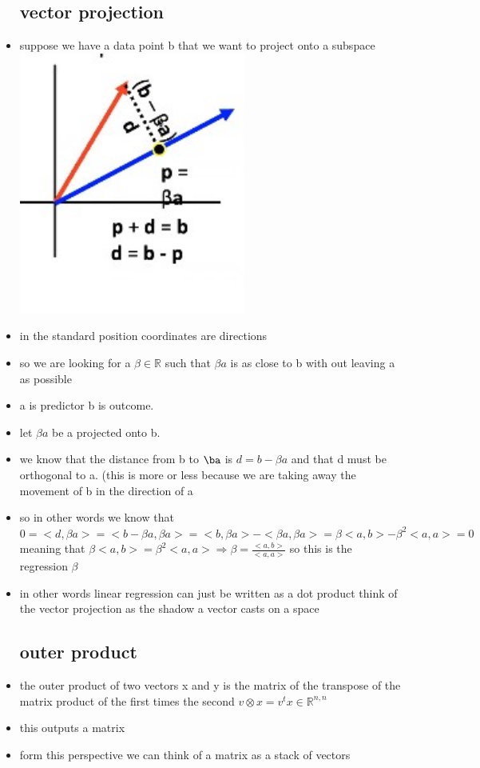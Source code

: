 \documentclass{article}
\begin{document}
\begin{itemize}
\subsection{vector projection}
\item suppose we have a data point b that we want to project onto a subspace
\includegraphics[width=7.5cm]{Final_Review/lecture_8/vector_projection.jpg}
\item in the standard position coordinates are directions \item so we are looking for a $\beta\in \mathbb{R}$ such that $\beta a$ is as close to b with out leaving a as possible 
\item a is predictor b is outcome. 
\item let $\beta a$ be a projected onto b. 
\item we know that the distance from b to $\ba$ is $d=b-\beta a$ and that d must be orthogonal to a. (this is more or less because we are taking away the movement of b in the direction of a 
\item so in other words we know that $0=<d,\beta a>=<b-\beta a, \beta a>=<b,\beta a>-<\beta a, \beta a>=\beta<a,b>-\beta^2<a,a>=0$ meaning that $\beta<a,b>=\beta^2<a,a>\Rightarrow \beta =\frac{<a,b>}{<a,a>}$ so this is the regression $\beta$
\item in other words linear regression can just be written as a dot product
\tem think of the vector projection as the shadow a vector casts on a space
\subsection{outer product}
\item the outer product of two vectors x and y is the matrix of the transpose of the matrix product of the first times the second  $v\otimes x=v^tx\in \mathbb{R}^{n,n}$
\item this outputs a matrix
\item form this perspective we can think of a matrix as a stack of vectors

\end{itemize}
\end{document}
